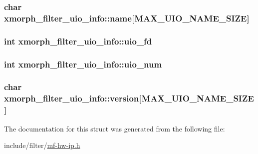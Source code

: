 \subsubsection[{\texorpdfstring{name}{name}}]{\setlength{\rightskip}{0pt plus 5cm}char xmorph\+\_\+filter\+\_\+uio\+\_\+info\+::name\mbox{[}{\bf M\+A\+X\+\_\+\+U\+I\+O\+\_\+\+N\+A\+M\+E\+\_\+\+S\+I\+ZE}\mbox{]}}\hypertarget{structxmorph__filter__uio__info_ad50f0ebca864e8164b94c25c79e36b28}{}\label{structxmorph__filter__uio__info_ad50f0ebca864e8164b94c25c79e36b28}
\subsubsection[{\texorpdfstring{uio\+\_\+fd}{uio_fd}}]{\setlength{\rightskip}{0pt plus 5cm}int xmorph\+\_\+filter\+\_\+uio\+\_\+info\+::uio\+\_\+fd}\hypertarget{structxmorph__filter__uio__info_ac61f755f744e49006814f2a7542e80c6}{}\label{structxmorph__filter__uio__info_ac61f755f744e49006814f2a7542e80c6}
\subsubsection[{\texorpdfstring{uio\+\_\+num}{uio_num}}]{\setlength{\rightskip}{0pt plus 5cm}int xmorph\+\_\+filter\+\_\+uio\+\_\+info\+::uio\+\_\+num}\hypertarget{structxmorph__filter__uio__info_ad4f78bdfe803c26ef3801365c475d410}{}\label{structxmorph__filter__uio__info_ad4f78bdfe803c26ef3801365c475d410}
\subsubsection[{\texorpdfstring{version}{version}}]{\setlength{\rightskip}{0pt plus 5cm}char xmorph\+\_\+filter\+\_\+uio\+\_\+info\+::version\mbox{[}{\bf M\+A\+X\+\_\+\+U\+I\+O\+\_\+\+N\+A\+M\+E\+\_\+\+S\+I\+ZE}\mbox{]}}\hypertarget{structxmorph__filter__uio__info_af338637c0c32343f3cd6806949f1f822}{}\label{structxmorph__filter__uio__info_af338637c0c32343f3cd6806949f1f822}


The documentation for this struct was generated from the following file\+:\begin{DoxyCompactItemize}
\item 
include/filter/\hyperlink{mf-hw-ip_8h}{mf-\/hw-\/ip.\+h}\end{DoxyCompactItemize}
